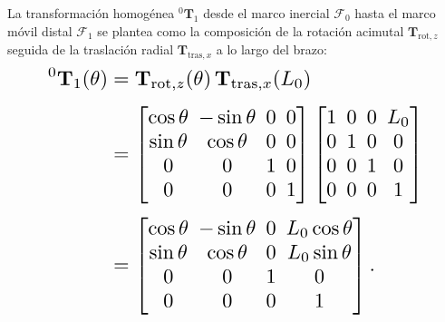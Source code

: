 La transformación homogénea ${}^{0}\mathbf{T}_1$ desde el marco inercial $\mathcal{F}_0$ hasta el marco móvil distal $\mathcal{F}_1$ se plantea como la composición de la rotación acimutal $\mathbf{T}_{\text{rot},z}$ seguida de la traslación radial $\mathbf{T}_{\text{tras},x}$ a lo largo del brazo:
\begin{equation}
\resizebox{0.86\columnwidth}{!}{$\displaystyle
    \setlength{\arraycolsep}{2.5pt}
    \begin{aligned}
        {}^{0}\mathbf{T}_1(\theta) &= \mathbf{T}_{\text{rot},z}(\theta)\,\mathbf{T}_{\text{tras},x}(L_0) \\[3pt]
        &= \begin{bmatrix}
            \cos\theta & -\sin\theta & 0 & 0 \\
            \sin\theta & \cos\theta & 0 & 0 \\
            0 & 0 & 1 & 0 \\
            0 & 0 & 0 & 1
        \end{bmatrix}
        \begin{bmatrix}
            1 & 0 & 0 & L_0 \\
            0 & 1 & 0 & 0 \\
            0 & 0 & 1 & 0 \\
            0 & 0 & 0 & 1
        \end{bmatrix} \\[3pt]
        &= \begin{bmatrix}
            \cos\theta & -\sin\theta & 0 & L_0\cos\theta \\
            \sin\theta & \cos\theta & 0 & L_0\sin\theta \\
            0 & 0 & 1 & 0 \\
            0 & 0 & 0 & 1
        \end{bmatrix}.
    \end{aligned}
$}
    \label{eq:transf_homogenea}
\end{equation}

